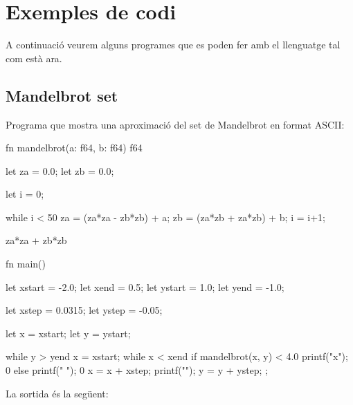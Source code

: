 ﻿\documentclass{article}
\begin{document}
\section{Exemples de codi}
A continuació veurem alguns programes que es poden fer amb el llenguatge tal com
està ara.

\subsection{Mandelbrot set}
Programa que mostra una aproximació del set de Mandelbrot en format ASCII:

\begin{code}
fn mandelbrot(a: f64, b: f64) f64 {
    let za = 0.0;
    let zb = 0.0;

    let i = 0;

    while i < 50 {
        za = (za*za - zb*zb) + a;
        zb = (za*zb + za*zb) + b;
        i = i+1;
    }

    za*za + zb*zb
}

fn main() {
    let xstart = -2.0;
    let xend = 0.5;
    let ystart = 1.0;
    let yend = -1.0;

    let xstep = 0.0315;
    let ystep = -0.05;

    let x = xstart;
    let y = ystart;

    while y > yend {
        x = xstart;
        while x < xend {
            if mandelbrot(x, y) < 4.0 {
                printf("x");
                0
            } else {
                printf(" ");
                0
            }
            x = x + xstep; 
        }
        printf("\n");
        y = y + ystep; 
    };
}
\end{code}

La sortida és la següent:
\end{document}
